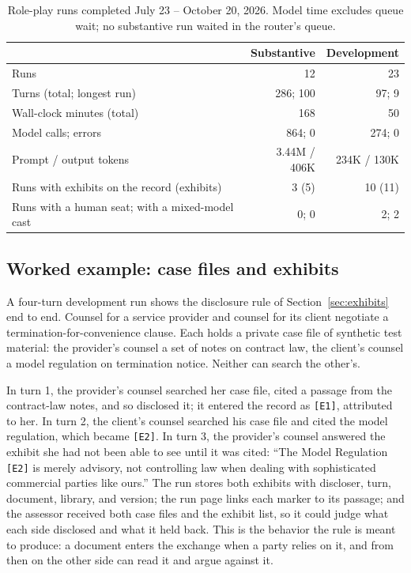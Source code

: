 \documentclass[acmsmall,screen,review]{acmart}
\newcommand{\mk}[1]{\texttt{[#1]}}
\begin{document}
\begin{table}[t]
\caption{Role-play runs completed July 23 -- October 20, 2026. Model time excludes queue wait; no substantive run waited in the router's queue.}
\label{tab:corpus}
\small
\begin{tabular}{@{}lrr@{}}
\toprule
 & Substantive & Development \\
\midrule
Runs & 12 & 23 \\
Turns (total; longest run) & 286; 100 & 97; 9 \\
Wall-clock minutes (total) & 168 & 50 \\
Model calls; errors & 864; 0 & 274; 0 \\
Prompt / output tokens & 3.44M / 406K & 234K / 130K \\
Runs with exhibits on the record (exhibits) & 3 (5) & 10 (11) \\
Runs with a human seat; with a mixed-model cast & 0; 0 & 2; 2 \\
\bottomrule
\end{tabular}
\end{table}

\subsection{Worked example: case files and exhibits}

A four-turn development run shows the disclosure rule of Section~\ref{sec:exhibits} end to end. Counsel for a service provider and counsel for its client negotiate a termination-for-convenience clause. Each holds a private case file of synthetic test material: the provider's counsel a set of notes on contract law, the client's counsel a model regulation on termination notice. Neither can search the other's.

In turn 1, the provider's counsel searched her case file, cited a passage from the contract-law notes, and so disclosed it; it entered the record as \mk{E1}, attributed to her. In turn 2, the client's counsel searched his case file and cited the model regulation, which became \mk{E2}. In turn 3, the provider's counsel answered the exhibit she had not been able to see until it was cited: ``The Model Regulation \mk{E2} is merely advisory, not controlling law when dealing with sophisticated commercial parties like ours.'' The run stores both exhibits with discloser, turn, document, library, and version; the run page links each marker to its passage; and the assessor received both case files and the exhibit list, so it could judge what each side disclosed and what it held back. This is the behavior the rule is meant to produce: a document enters the exchange when a party relies on it, and from then on the other side can read it and argue against it.
\end{document}
